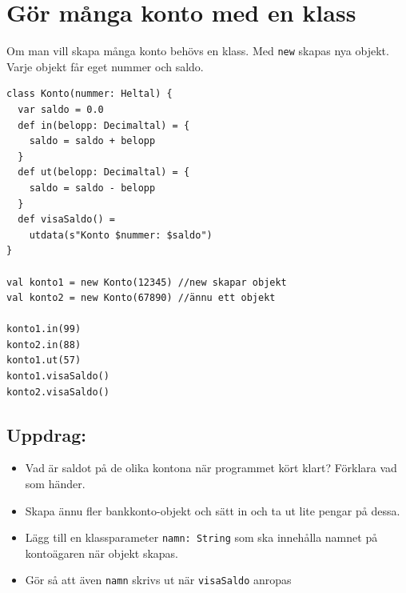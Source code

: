 \chapter{Gör många konto med en klass}
\begin{multicols}{2}
Om man vill skapa många konto behövs en klass. Med \lstinline{new} skapas nya objekt. Varje objekt får eget nummer och saldo.

\begin{lstlisting}[basicstyle={\ttfamily\fontsize{14}{17}\selectfont},numbers=none]
class Konto(nummer: Heltal) {
  var saldo = 0.0 
  def in(belopp: Decimaltal) = {
    saldo = saldo + belopp
  }
  def ut(belopp: Decimaltal) = {
    saldo = saldo - belopp
  }
  def visaSaldo() = 
    utdata(s"Konto $nummer: $saldo")
}

val konto1 = new Konto(12345) //new skapar objekt 
val konto2 = new Konto(67890) //ännu ett objekt

konto1.in(99)
konto2.in(88)
konto1.ut(57)
konto1.visaSaldo()
konto2.visaSaldo()
\end{lstlisting}
        


\columnbreak


\section*{\color{BrickRed}Uppdrag:}


\begin{itemize}

\item {Vad är saldot på de olika kontona när programmet kört klart? Förklara vad som händer.}
\item {Skapa ännu fler bankkonto-objekt och sätt in och ta ut lite pengar på dessa.}
\item {Lägg till en klassparameter \lstinline{namn: String} som ska innehålla namnet på kontoägaren när objekt skapas.}
\item {Gör så att även \lstinline{namn} skrivs ut när \lstinline{visaSaldo} anropas}

\end{itemize}


\end{multicols}

